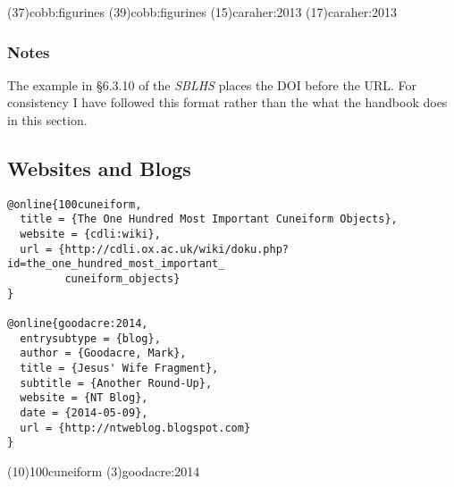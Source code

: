 \documentclass[a4paper]{article}
\begin{document}
\examplecite(37){cobb:figurines}
\examplecite(39){cobb:figurines}
\examplecite(15){caraher:2013}
\examplecite(17){caraher:2013}
\examplebibliography

\subsubsection{Notes}

The example in §6.3.10 of the \emph{SBLHS} places the DOI before the URL. For
consistency I have followed this format rather than the what the handbook does
in this section.

\subsection{Websites and Blogs}

\begin{verbatim}
@online{100cuneiform,
  title = {The One Hundred Most Important Cuneiform Objects},
  website = {cdli:wiki},
  url = {http://cdli.ox.ac.uk/wiki/doku.php?id=the_one_hundred_most_important_
         cuneiform_objects}
}

@online{goodacre:2014,
  entrysubtype = {blog},
  author = {Goodacre, Mark},
  title = {Jesus' Wife Fragment},
  subtitle = {Another Round-Up},
  website = {NT Blog},
  date = {2014-05-09},
  url = {http://ntweblog.blogspot.com}
}
\end{verbatim}

\examplecite(10){100cuneiform}
\examplecite(3){goodacre:2014}
\examplebibliography
\end{document}
